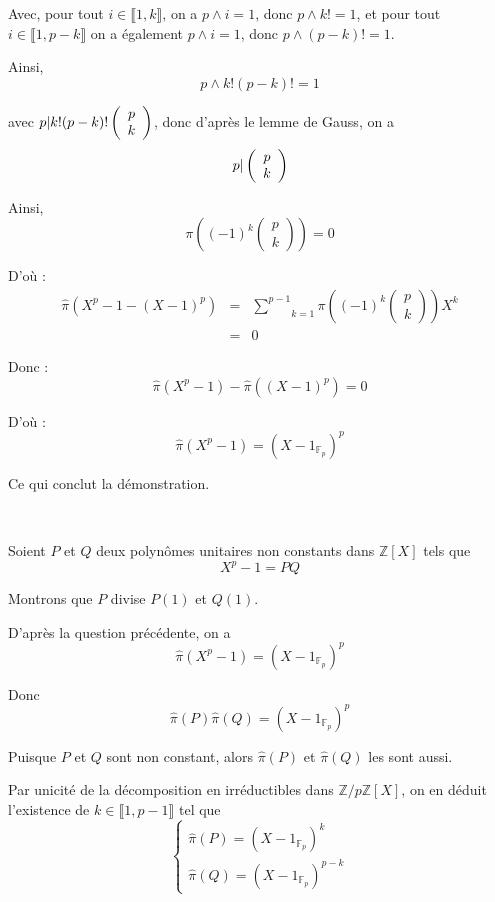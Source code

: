 Avec, pour tout $i \in \llbracket 1, k \rrbracket$, on a $p \wedge i = 1$,
donc $p \wedge k! = 1$, et pour tout $i \in \llbracket 1, p - k \rrbracket$ on
a {\'e}galement $p \wedge i = 1$, donc $p \wedge (p - k) ! = 1$.

Ainsi,
\[ p \wedge k! (p - k) ! = 1 \]


avec $p |  k! (p - k) ! \left( \begin{array}{c}
  p\\
  k
\end{array} \right)$, donc d'apr{\`e}s le lemme de Gauss, on a
\[ p |  \left( \begin{array}{c}
     p\\
     k
   \end{array} \right) \]


Ainsi,
\[ \pi \left( (- 1)^k \left( \begin{array}{c}
     p\\
     k
   \end{array} \right) \right) = 0 \]


D'o{\`u} :
\begin{eqnarray*}
  \hat{\pi} (X^p - 1 - (X - 1)^p) & = & \underset{k = 1}{\overset{p -
  1}{\sum}} \pi \left( (- 1)^k \left( \begin{array}{c}
    p\\
    k
  \end{array} \right) \right) X^k\\
  & = & 0
\end{eqnarray*}


Donc :
\[ \hat{\pi} (X^p - 1) - \hat{\pi} ((X - 1)^p) = 0 \]


D'o{\`u} :
\[ \hat{\pi} (X^p - 1) = (X - 1_{\mathbb{F}_p})^p \]


Ce qui conclut la d{\'e}monstration.

\

 Soient $P$ et $Q$ deux polyn{\^o}mes unitaires non
constants dans $\mathbb{Z} [X]$ tels que
\[ X^p - 1 = P Q \]


Montrons que $P$ divise $P (1)$ et $Q (1)$.

D'apr{\`e}s la question pr{\'e}c{\'e}dente, on a
\[ \hat{\pi} (X^p - 1) = (X - 1_{\mathbb{F}_p})^p \]


Donc
\[ \hat{\pi} (P) \hat{\pi} (Q) = (X - 1_{\mathbb{F}_p})^p \]


Puisque $P$ et $Q$ sont non constant, alors $\hat{\pi} (P)$ et $\hat{\pi} (Q)$
les sont aussi.

Par unicit{\'e} de la d{\'e}composition en irr{\'e}ductibles dans $\mathbb{Z}/
p\mathbb{Z} [X]$, on en d{\'e}duit l'existence de $k \in \llbracket 1, p - 1
\rrbracket$ tel que
\[ \left\{\begin{array}{l}
     \hat{\pi} (P) = (X - 1_{\mathbb{F}_p})^k\\
     \hat{\pi} (Q) = (X - 1_{\mathbb{F}_p})^{p - k}
   \end{array}\right. \]


